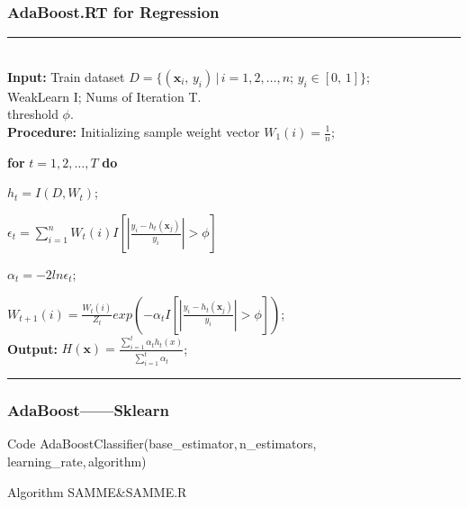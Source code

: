 \documentclass[usenames,dvipsnames]{beamer}
\begin{document}
\begin{frame}
\frametitle{AdaBoost.RT for Regression}
\noindent\rule[0.1\baselineskip]{\textwidth}{0.5pt}\\
\textbf{Input:} Train dataset $D = \{(\textbf{x}_i,\,y_i)\,|\,i = 1, 2,\dots, n;\, y_i \in [0,\,1]\}$;\\
\hspace*{32pt} WeakLearn I; Nums of Iteration T.\\
\hspace*{32pt} threshold $\phi$.\\
\textbf{Procedure:} 
    \hspace*{2pt} Initializing sample weight vector $W_1(i) = \frac{1}{n}$;\par
    \hspace*{32pt} \textbf{for} $t = 1, 2,\dots, T$ \textbf{do}\par
        \hspace*{48pt} $h_t = I(D, W_t)$;\par
        \hspace*{48pt} $\epsilon_t = \sum_{i=1}^{n}W_t(i)I[|\frac{y_i-h_t(\textbf{x}_j)}{y_i}|>\phi]$\par
        \hspace*{48pt} $\alpha_t = -2ln\epsilon_t$;\par
        \hspace*{48pt} $W_{t+1}(i) = \frac{W_{t}(i)}{Z_t}exp(-\alpha_tI[|\frac{y_i-h_t(\textbf{x}_j)}{y_i}|>\phi])$;\\
\textbf{Output:} $H(\textbf{x}) = \frac{\sum_{i=1}^t\alpha_th_t(x)}{\sum_{i=1}^{t}\alpha_t}$;\par
\noindent\rule[0.1\baselineskip]{\textwidth}{0.75pt}
\end{frame}
\begin{frame}
\frametitle{AdaBoost——Sklearn}
\begin{block}{Code}
AdaBoostClassifier(base\_estimator,\,n\_estimators,\\
\hspace*{64pt}learning\_rate,\,algorithm)
\end{block}
\begin{block}{Algorithm}
SAMME\&SAMME.R
\end{block}
\end{frame}
\end{document}
